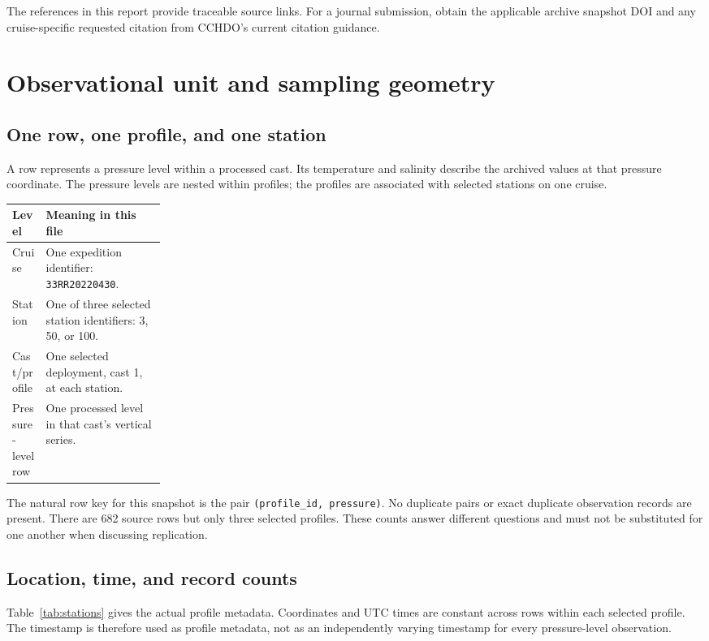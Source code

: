\documentclass[11pt,letterpaper]{article}
\newcommand{\field}[1]{\nolinkurl{#1}}
\begin{document}
The references in this report provide traceable source links. For a journal submission, obtain the applicable archive snapshot DOI and any cruise-specific requested citation from CCHDO's current citation guidance.

\section{Observational unit and sampling geometry}
\label{sec:unit}

\subsection{One row, one profile, and one station}
A row represents a pressure level within a processed cast. Its temperature and salinity describe the archived values at that pressure coordinate. The pressure levels are nested within profiles; the profiles are associated with selected stations on one cruise.

\begin{center}
\begin{tabularx}{\linewidth}{L{0.22\linewidth}Y}
\toprule
\textbf{Level} & \textbf{Meaning in this file} \\
\midrule
Cruise & One expedition identifier: \field{33RR20220430}. \\
Station & One of three selected station identifiers: 3, 50, or 100. \\
Cast/profile & One selected deployment, cast 1, at each station. \\
Pressure-level row & One processed level in that cast's vertical series. \\
\bottomrule
\end{tabularx}
\end{center}

The natural row key for this snapshot is the pair
\field{(profile_id, pressure)}. No duplicate pairs or exact duplicate observation records are present. There are 682 source rows but only three selected profiles. These counts answer different questions and must not be substituted for one another when discussing replication.

\subsection{Location, time, and record counts}
Table~\ref{tab:stations} gives the actual profile metadata. Coordinates and UTC times are constant across rows within each selected profile. The timestamp is therefore used as profile metadata, not as an independently varying timestamp for every pressure-level observation.
\end{document}
